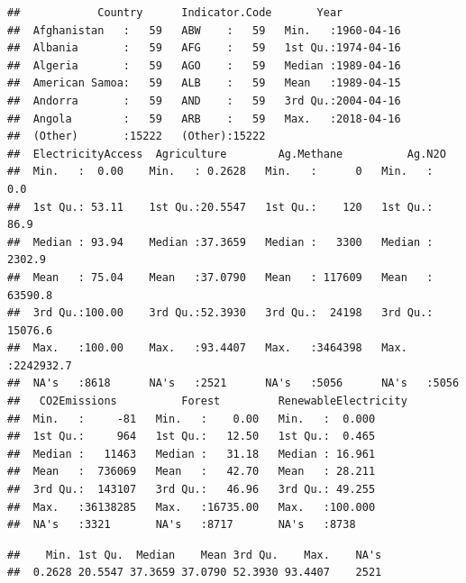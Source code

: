 \documentclass[12pt,]{article}
\newenvironment{Shaded}{\begin{snugshade}}{\end{snugshade}}
\newcommand{\KeywordTok}[1]{\textcolor[rgb]{0.13,0.29,0.53}{\textbf{#1}}}
\newcommand{\OperatorTok}[1]{\textcolor[rgb]{0.81,0.36,0.00}{\textbf{#1}}}
\newcommand{\NormalTok}[1]{#1}
\begin{document}
\begin{verbatim}
##            Country      Indicator.Code       Year           
##  Afghanistan   :   59   ABW    :   59   Min.   :1960-04-16  
##  Albania       :   59   AFG    :   59   1st Qu.:1974-04-16  
##  Algeria       :   59   AGO    :   59   Median :1989-04-16  
##  American Samoa:   59   ALB    :   59   Mean   :1989-04-15  
##  Andorra       :   59   AND    :   59   3rd Qu.:2004-04-16  
##  Angola        :   59   ARB    :   59   Max.   :2018-04-16  
##  (Other)       :15222   (Other):15222                       
##  ElectricityAccess  Agriculture        Ag.Methane          Ag.N2O         
##  Min.   :  0.00    Min.   : 0.2628   Min.   :      0   Min.   :      0.0  
##  1st Qu.: 53.11    1st Qu.:20.5547   1st Qu.:    120   1st Qu.:     86.9  
##  Median : 93.94    Median :37.3659   Median :   3300   Median :   2302.9  
##  Mean   : 75.04    Mean   :37.0790   Mean   : 117609   Mean   :  63590.8  
##  3rd Qu.:100.00    3rd Qu.:52.3930   3rd Qu.:  24198   3rd Qu.:  15076.6  
##  Max.   :100.00    Max.   :93.4407   Max.   :3464398   Max.   :2242932.7  
##  NA's   :8618      NA's   :2521      NA's   :5056      NA's   :5056       
##   CO2Emissions          Forest         RenewableElectricity
##  Min.   :     -81   Min.   :    0.00   Min.   :  0.000     
##  1st Qu.:     964   1st Qu.:   12.50   1st Qu.:  0.465     
##  Median :   11463   Median :   31.18   Median : 16.961     
##  Mean   :  736069   Mean   :   42.70   Mean   : 28.211     
##  3rd Qu.:  143107   3rd Qu.:   46.96   3rd Qu.: 49.255     
##  Max.   :36138285   Max.   :16735.00   Max.   :100.000     
##  NA's   :3321       NA's   :8717       NA's   :8738
\end{verbatim}

\begin{Shaded}
\end{Shaded}

\begin{verbatim}
##    Min. 1st Qu.  Median    Mean 3rd Qu.    Max.    NA's 
##  0.2628 20.5547 37.3659 37.0790 52.3930 93.4407    2521
\end{verbatim}

\begin{Shaded}
\end{Shaded}
\end{document}
